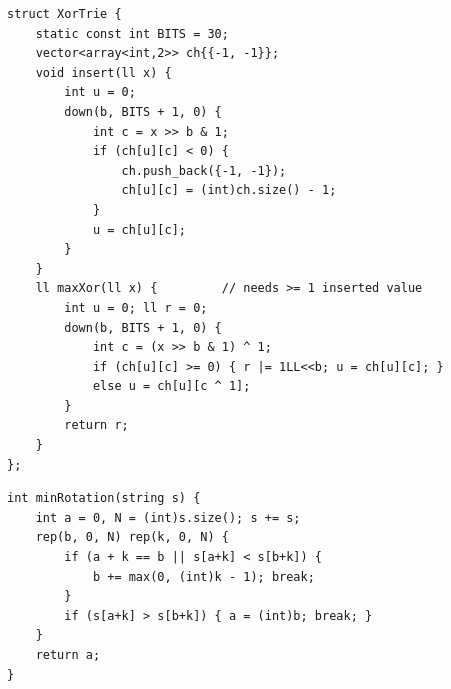 \begin{lstlisting}
struct XorTrie {
    static const int BITS = 30;
    vector<array<int,2>> ch{{-1, -1}};
    void insert(ll x) {
        int u = 0;
        down(b, BITS + 1, 0) {
            int c = x >> b & 1;
            if (ch[u][c] < 0) {
                ch.push_back({-1, -1});
                ch[u][c] = (int)ch.size() - 1;
            }
            u = ch[u][c];
        }
    }
    ll maxXor(ll x) {         // needs >= 1 inserted value
        int u = 0; ll r = 0;
        down(b, BITS + 1, 0) {
            int c = (x >> b & 1) ^ 1;
            if (ch[u][c] >= 0) { r |= 1LL<<b; u = ch[u][c]; }
            else u = ch[u][c ^ 1];
        }
        return r;
    }
};
\end{lstlisting}


\begin{lstlisting}
int minRotation(string s) {
    int a = 0, N = (int)s.size(); s += s;
    rep(b, 0, N) rep(k, 0, N) {
        if (a + k == b || s[a+k] < s[b+k]) {
            b += max(0, (int)k - 1); break;
        }
        if (s[a+k] > s[b+k]) { a = (int)b; break; }
    }
    return a;
}
\end{lstlisting}
